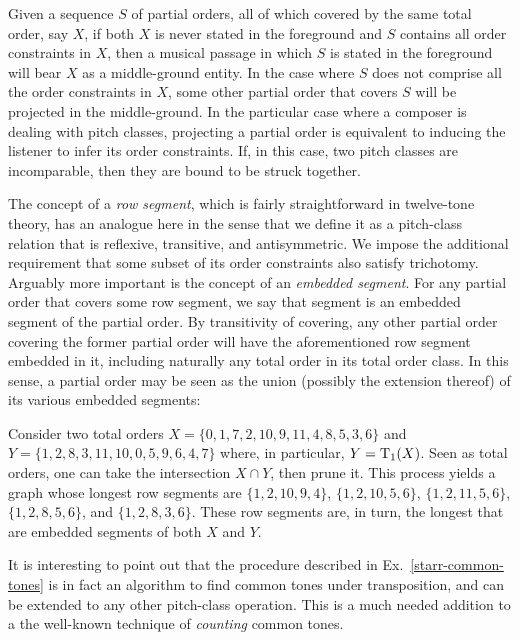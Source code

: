 \begin{example}
    \cite[197]{Starr1984}
    Given a sequence $S$ of partial orders, all of which covered by the same total order, say $X$, if both $X$ is never stated in the foreground and $S$ contains all order constraints in $X$, then a musical passage in which $S$ is stated in the foreground will bear $X$ as a middle-ground entity. In the case where $S$ does not comprise all the order constraints in $X$, some other partial order that covers $S$ will be projected in the middle-ground. In the particular case where a composer is dealing with pitch classes, projecting a partial order is equivalent to inducing the listener to infer its order constraints. If, in this case, two pitch classes are incomparable, then they are bound to be struck together.
\end{example}

The concept of a \emph{row segment}, which is fairly straightforward in twelve-tone theory, has an analogue here in the sense that we define it as a pitch-class relation that is reflexive, transitive, and antisymmetric. We impose the additional requirement that some subset of its order constraints also satisfy trichotomy. Arguably more important is the concept of an \emph{embedded segment}. For any partial order that covers some row segment, we say that segment is an embedded segment of the partial order. By transitivity of covering, any other partial order covering the former partial order will have the aforementioned row segment embedded in it, including naturally any total order in its total order class. In this sense, a partial order may be seen as the union (possibly the extension thereof) of its various embedded segments:

\begin{example}
    \label{starr-common-tones}
    \cite[200]{Starr1984}
    Consider two total orders $X = \{ 0, 1, 7, 2, 10, 9, 11, 4, 8, 5, 3, 6 \}$ and $Y = \{ 1, 2, 8, 3, 11, 10, 0, 5, 9, 6, 4, 7 \}$ where, in particular, $Y = \operatorname{T}_1(X)$. Seen as total orders, one can take the intersection $X \cap Y$, then prune it. This process yields a graph whose longest row segments are $\{ 1, 2, 10, 9, 4 \}$, $\{ 1, 2, 10, 5, 6 \}$, $\{ 1, 2, 11, 5, 6 \}$, $\{ 1, 2, 8, 5, 6 \}$, and $\{ 1, 2, 8, 3, 6 \}$. These row segments are, in turn, the longest that are embedded segments of both $X$ and $Y$.
\end{example}

It is interesting to point out that the procedure described in Ex.~\ref{starr-common-tones} is in fact an algorithm to find common tones under transposition, and can be extended to any other pitch-class operation. This is a much needed addition to a the well-known technique of \emph{counting} common tones.

